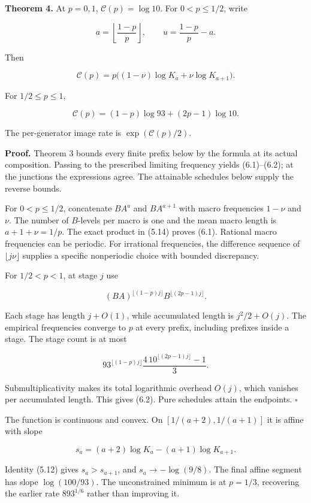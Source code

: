 \textbf{Theorem 4.} At \(p=0,1\), \(\mathcal C(p)=\log10\). For \(0<p\le1/2\), write

\[
a=\left\lfloor\frac{1-p}{p}\right\rfloor,\qquad
u=\frac{1-p}{p}-a.
\]

Then

\[
\boxed{\mathcal C(p)=p\bigl((1-\nu)\log K_a+\nu\log K_{a+1}\bigr).}
\tag{6.1}
\]

For \(1/2\le p\le1\),

\[
\boxed{\mathcal C(p)=(1-p)\log93+(2p-1)\log10.}
\tag{6.2}
\]

The per-generator image rate is \(\exp(\mathcal C(p)/2)\).

\textbf{Proof.} Theorem 3 bounds every finite prefix below by the formula at its actual composition. Passing to the prescribed limiting frequency yields (6.1)--(6.2); at the junctions the expressions agree. The attainable schedules below supply the reverse bounds.

For \(0<p\le1/2\), concatenate \(BA^a\) and \(BA^{a+1}\) with macro frequencies \(1-\nu\) and \(\nu\). The number of \(B\)-levels per macro is one and the mean macro length is \(a+1+\nu=1/p\). The exact product in (5.14) proves (6.1). Rational macro frequencies can be periodic. For irrational frequencies, the difference sequence of \(\lfloor j\nu\rfloor\) supplies a specific nonperiodic choice with bounded discrepancy.

For \(1/2<p<1\), at stage \(j\) use

\[
(BA)^{\lfloor(1-p)j\rfloor}
B^{\lfloor(2p-1)j\rfloor}.
\tag{6.3}
\]

Each stage has length \(j+O(1)\), while accumulated length is \(j^2/2+O(j)\). The empirical frequencies converge to \(p\) at every prefix, including prefixes inside a stage. The stage count is at most

\[
93^{\lfloor(1-p)j\rfloor}
\frac{4\,10^{\lfloor(2p-1)j\rfloor}-1}{3}.
\]

Submultiplicativity makes its total logarithmic overhead \(O(j)\), which vanishes per accumulated length. This gives (6.2). Pure schedules attain the endpoints. \(\square\)

The function is continuous and convex. On \([1/(a+2),1/(a+1)]\) it is affine with slope

\[
s_a=(a+2)\log K_a-(a+1)\log K_{a+1}.
\tag{6.4}
\]

Identity (5.12) gives \(s_a>s_{a+1}\), and \(s_a\to-\log(9/8)\). The final affine segment has slope \(\log(100/93)\). The unconstrained minimum is at \(p=1/3\), recovering the earlier rate \(893^{1/6}\) rather than improving it.

